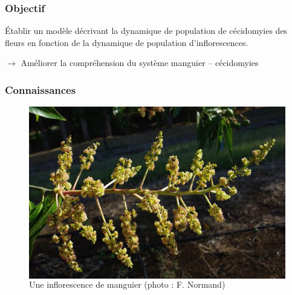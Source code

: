 \documentclass[xcolor={dvipsnames}]{beamer}
\begin{document}
\begin{frame}
 \frametitle{Objectif}
 
 Établir un modèle décrivant la dynamique de population de cécidomyies des fleurs en fonction de la dynamique de population d'inflorescences.
 
 \vspace{1cm}
 
$\longrightarrow$ Améliorer la compréhension du système manguier -- cécidomyies
\end{frame}



\begin{frame}
 \frametitle{Connaissances}
 \begin{figure}[ht]
 \centering
 \begin{columns}
\includegraphics[scale = 0.29]{../photos/inflo3.jpg}
 \caption{Une inflorescence de manguier (photo : F. Normand)}
        \label{fig:inflos}
  \end{columns}

 

\end{figure}
\end{frame}
\end{document}
